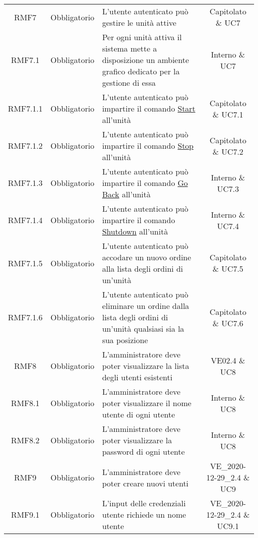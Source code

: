 \begin{longtable}[h!] { c c m{8cm} c}
		RMF7 & Obbligatorio & L'utente autenticato può gestire le unità attive & Capitolato \& UC7 \\

		RMF7.1 & Obbligatorio & Per ogni unità attiva il sistema mette a disposizione un ambiente grafico dedicato per la gestione di essa & Interno \& UC7 \\

		RMF7.1.1 & Obbligatorio & L'utente autenticato può impartire il comando \underline{Start} all'unità & Capitolato \& UC7.1 \\

		RMF7.1.2 & Obbligatorio & L'utente autenticato può impartire il comando \underline{Stop} all'unità & Capitolato \& UC7.2 \\

		RMF7.1.3 & Obbligatorio & L'utente autenticato può impartire il comando \underline{Go Back} all'unità & Interno \& UC7.3 \\

		RMF7.1.4 & Obbligatorio & L'utente autenticato può impartire il comando \underline{Shutdown} all'unità & Interno \& UC7.4 \\

		RMF7.1.5 & Obbligatorio & L'utente autenticato può accodare un nuovo ordine alla lista degli ordini di un'unità & Capitolato \& UC7.5 \\

		RMF7.1.6 & Obbligatorio & L'utente autenticato può eliminare un ordine dalla lista degli ordini di un'unità qualsiasi sia la sua posizione & Capitolato \& UC7.6 \\

		RMF8 & Obbligatorio & L'amministratore deve poter visualizzare la lista degli utenti esistenti & VE02.4 \& UC8 \\

		RMF8.1 & Obbligatorio & L'amministratore deve poter visualizzare il nome utente di ogni utente & Interno \& UC8 \\

		RMF8.2 & Obbligatorio & L'amministratore deve poter visualizzare la password di ogni utente & Interno \& UC8 \\

		RMF9 & Obbligatorio & L'amministratore deve poter creare nuovi utenti & VE\_2020-12-29\_2.4 \& UC9 \\

		RMF9.1 & Obbligatorio & L'input delle credenziali utente richiede un nome utente & VE\_2020-12-29\_2.4 \& UC9.1 \\


\end{longtable}
